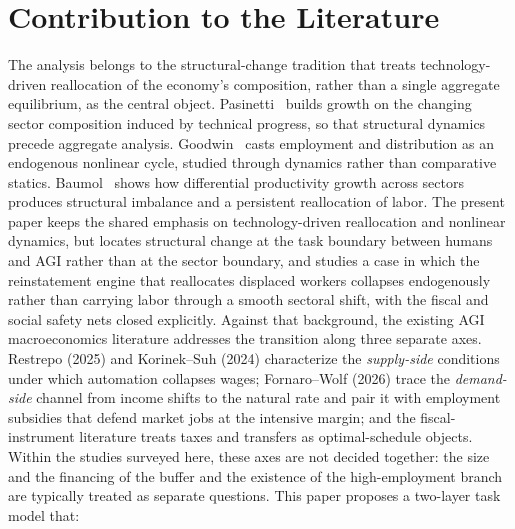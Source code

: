 \documentclass[review,12pt]{elsarticle}
\theoremstyle{plain}
\theoremstyle{definition}
\theoremstyle{remark}
\begin{document}
\section{Contribution to the Literature}
\label{sec:literature}
The analysis belongs to the structural-change tradition that treats technology-driven reallocation of the economy's composition, rather than a single aggregate equilibrium, as the central object. Pasinetti~\cite{Pasinetti1981} builds growth on the changing sector composition induced by technical progress, so that structural dynamics precede aggregate analysis. Goodwin~\cite{Goodwin1967} casts employment and distribution as an endogenous nonlinear cycle, studied through dynamics rather than comparative statics. Baumol~\cite{Baumol1967} shows how differential productivity growth across sectors produces structural imbalance and a persistent reallocation of labor. The present paper keeps the shared emphasis on technology-driven reallocation and nonlinear dynamics, but locates structural change at the task boundary between humans and AGI rather than at the sector boundary, and studies a case in which the reinstatement engine that reallocates displaced workers collapses endogenously rather than carrying labor through a smooth sectoral shift, with the fiscal and social safety nets closed explicitly. Against that background, the existing AGI macroeconomics literature addresses the transition along three separate axes. Restrepo (2025) and Korinek--Suh (2024) characterize the \emph{supply-side} conditions under which automation collapses wages; Fornaro--Wolf (2026) trace the \emph{demand-side} channel from income shifts to the natural rate and pair it with employment subsidies that defend market jobs at the intensive margin; and the fiscal-instrument literature treats taxes and transfers as optimal-schedule objects. Within the studies surveyed here, these axes are not decided together: the size and the financing of the buffer and the existence of the high-employment branch are typically treated as separate questions. This paper proposes a two-layer task model that:
\end{document}
